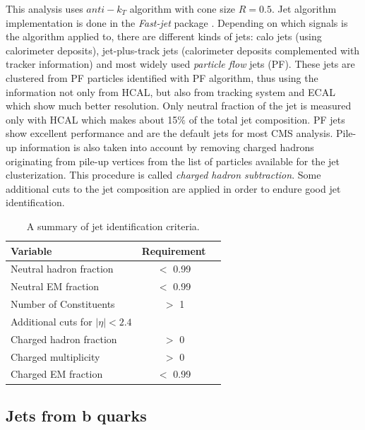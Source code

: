 This analysis uses $anti-k_T$ algorithm with cone size $R=0.5$. Jet algorithm implementation is done in the \textit{Fast-jet} package \cite{Cacciari:2011ma}. Depending on which signals is the algorithm applied to, there are different kinds of jets: calo jets (using calorimeter deposits), jet-plus-track jets (calorimeter deposits complemented with tracker information) and most widely used \textit{particle flow} jets (PF). These jets are clustered from PF particles identified with PF algorithm, thus using the information not only from HCAL, but also from tracking system and ECAL which show much better resolution. Only neutral fraction of the jet is measured only with HCAL which makes about 15$\%$ of the total jet composition. PF jets show excellent performance and are the default jets for most CMS analysis. Pile-up information is also taken into account by removing charged hadrons originating from pile-up vertices from the list of particles available for the jet clusterization. This procedure is called \textit{charged hadron subtraction}. Some additional cuts to the jet composition are applied in order to endure good jet identification.  
  \begin{table}[h]
\centering
  \caption{A summary of jet identification criteria.}
  \label{tab:jetID}
  \begin{tabular}{ l  c c}
      \hline
      \hline
      	Variable & Requirement \\
      	\hline
    		Neutral hadron fraction & $<$ 0.99  \\
     	Neutral EM fraction & $<$ 0.99 \\
     	Number of Constituents & $>$ 1 \\		
		\hline
		Additional cuts for $|\eta|<2.4$ \\
		\hline
		Charged hadron fraction & $>$ 0 \\ 
		Charged multiplicity & $>$ 0 \\
		Charged EM fraction & $<$ 0.99 \\
      \hline
      \hline 
  \end{tabular}
\end{table}


\subsection{Jets from b quarks}

